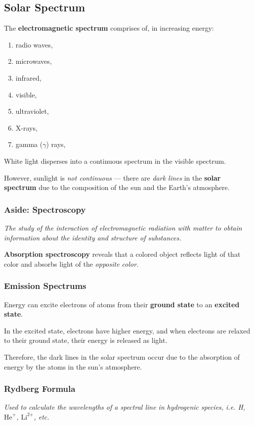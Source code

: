 \subsection{Solar Spectrum}
The \textbf{electromagnetic spectrum} comprises of, in increasing energy:
\begin{enumerate}
    \item radio waves,
    \item microwaves,
    \item infrared,
    \item visible,
    \item ultraviolet,
    \item X-rays,
    \item gamma ($\gamma$) rays,
\end{enumerate}

White light disperses into a continuous spectrum in the visible spectrum.

However, sunlight is \emph{not continuous} --- there are \emph{dark lines} in
the \textbf{solar spectrum} due to the composition of the sun and the Earth's atmosphere.

\subsubsection{Aside: Spectroscopy}

\emph{The study of the interaction of \emph{electromagnetic radiation}
with \emph{matter} to obtain information about the identity and structure of substances.}

\textbf{Absorption spectroscopy} reveals that a colored object reflects light of that color
and absorbs light of the \textit{opposite color}.

\subsubsection{Emission Spectrums}
Energy can excite electrons of atoms from their \textbf{ground state} to an \textbf{excited state}.

In the excited state, electrons have higher energy, and when electrons are relaxed to their
ground state, their energy is released as light.

Therefore, the dark lines in the solar spectrum occur due to the absorption of energy
by the atoms in the sun's atmosphere.

\subsubsection{Rydberg Formula}
\emph{Used to calculate the wavelengths of a spectral line in hydrogenic species, i.e. H, $\text{He}^{\text{+}}$, $\text{Li}^{\text{2+}}$, etc.}

